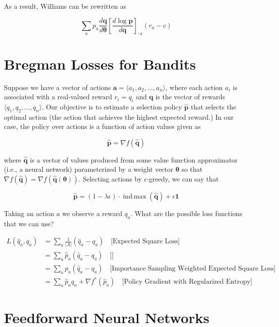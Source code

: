 \documentclass[10pt]{article}
\newcommand{\indmax}{\operatorname{ind\,max}}
\theoremstyle{definition}
\begin{document}
\noindent
As a result, Williams can be rewritten as

$$
\sum_a p_a \frac{d\mathbf{q}}{d\pmb{\theta}}\left[\frac{d\log\mathbf{p}}{d\mathbf{q}}\right]_{:a}(r_a - c)
$$

\section*{Bregman Losses for Bandits}

Suppose we have a vector of actions $\mathbf{a} = \langle a_1, a_2, \hdots, a_n\rangle$, where each action $a_i$ is associated with a real-valued reward $r_i = q_i$ and $\mathbf{q}$ is the vector of rewards $\langle q_1, q_2, \hdots, q_n\rangle$. Our objective is to estimate a selection policy $\mathbf{\hat{p}}$ that selects the optimal action (the action that achieves the highest expected reward.) In our case, the policy over actions is a function of action values given as

$$
\mathbf{\hat{p}} = \nabla f(\mathbf{\hat{q}})
$$

\noindent
where $\mathbf{\hat{q}}$ is a vector of values produced from some value function approximator (i.e., a neural network) parameterized by a weight vector $\pmb{\theta}$ so that $\nabla f(\mathbf{\hat{q}}) = \nabla f(\mathbf{\hat{q}(\pmb{\theta})})$. Selecting actions by $\epsilon$-greedy, we can say that

$$
\mathbf{\hat{p}} = (1 - \lambda\epsilon)\cdot\indmax (\mathbf{\hat{q}}) + \epsilon\mathbf{1}
$$

\noindent
Taking an action $a$ we observe a reward $q_a$. What are the possible loss functions that we can use?

\begin{equation*}
\begin{aligned}
L(\hat{q}_a,q_a) & = \sum_a\frac{1}{\lvert A \rvert}(\hat{q}_a - q_a) \quad \text{[Expected Square Loss]} \\
& = \sum_a\hat{p}_a(\hat{q}_a - q_a) \quad \text{[]} \\
& = \sum_a p_a(\hat{q}_a - q_a) \quad \text{[Importance Sampling Weighted Expected Square Loss]} \\
& = \sum_a \hat{p}_a q_a + \nabla f^*(\hat{p}_a) \quad \text{[Policy Gradient with Regularized Entropy]}
\end{aligned}
\end{equation*}

\section*{Feedforward Neural Networks}
\end{document}
